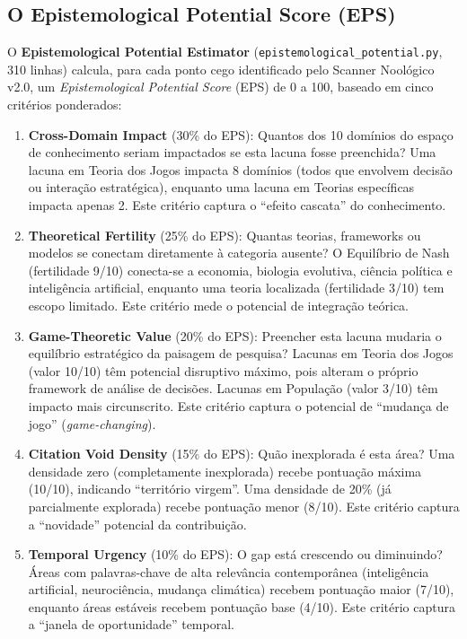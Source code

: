 \documentclass[12pt,a4paper]{article}
\begin{document}
\subsection{O Epistemological Potential Score (EPS)}

O \textbf{Epistemological Potential Estimator} (\texttt{epistemological\_potential.py}, 310 linhas) calcula, para cada ponto cego identificado pelo Scanner Noológico v2.0, um \textit{Epistemological Potential Score} (EPS) de 0 a 100, baseado em cinco critérios ponderados:

\begin{enumerate}[itemsep=2pt]
  \item \textbf{Cross-Domain Impact} (30\% do EPS): Quantos dos 10 domínios do espaço de conhecimento seriam impactados se esta lacuna fosse preenchida? Uma lacuna em Teoria dos Jogos impacta 8 domínios (todos que envolvem decisão ou interação estratégica), enquanto uma lacuna em Teorias específicas impacta apenas 2. Este critério captura o ``efeito cascata'' do conhecimento.
  \item \textbf{Theoretical Fertility} (25\% do EPS): Quantas teorias, frameworks ou modelos se conectam diretamente à categoria ausente? O Equilíbrio de Nash (fertilidade 9/10) conecta-se a economia, biologia evolutiva, ciência política e inteligência artificial, enquanto uma teoria localizada (fertilidade 3/10) tem escopo limitado. Este critério mede o potencial de integração teórica.
  \item \textbf{Game-Theoretic Value} (20\% do EPS): Preencher esta lacuna mudaria o equilíbrio estratégico da paisagem de pesquisa? Lacunas em Teoria dos Jogos (valor 10/10) têm potencial disruptivo máximo, pois alteram o próprio framework de análise de decisões. Lacunas em População (valor 3/10) têm impacto mais circunscrito. Este critério captura o potencial de ``mudança de jogo'' (\textit{game-changing}).
  \item \textbf{Citation Void Density} (15\% do EPS): Quão inexplorada é esta área? Uma densidade zero (completamente inexplorada) recebe pontuação máxima (10/10), indicando ``território virgem''. Uma densidade de 20\% (já parcialmente explorada) recebe pontuação menor (8/10). Este critério captura a ``novidade'' potencial da contribuição.
  \item \textbf{Temporal Urgency} (10\% do EPS): O gap está crescendo ou diminuindo? Áreas com palavras-chave de alta relevância contemporânea (inteligência artificial, neurociência, mudança climática) recebem pontuação maior (7/10), enquanto áreas estáveis recebem pontuação base (4/10). Este critério captura a ``janela de oportunidade'' temporal.
\end{enumerate}
\end{document}
